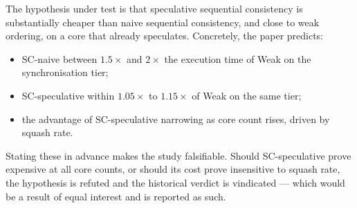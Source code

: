The hypothesis under test is that speculative sequential consistency is
substantially cheaper than naive sequential consistency, and close to weak
ordering, on a core that already speculates.
Concretely, the paper predicts:

\begin{itemize}
\item SC-naive between $1.5\times$ and $2\times$ the execution time of Weak on the
  synchronisation tier;
\item SC-speculative within $1.05\times$ to $1.15\times$ of Weak on the same tier;
\item the advantage of SC-speculative narrowing as core count rises, driven by
  squash rate.
\end{itemize}

Stating these in advance makes the study falsifiable.
Should SC-speculative prove
expensive at all core counts, or should its cost prove insensitive to squash rate,
the hypothesis is refuted and the historical verdict is vindicated --- which would
be a result of equal interest and is reported as such.
